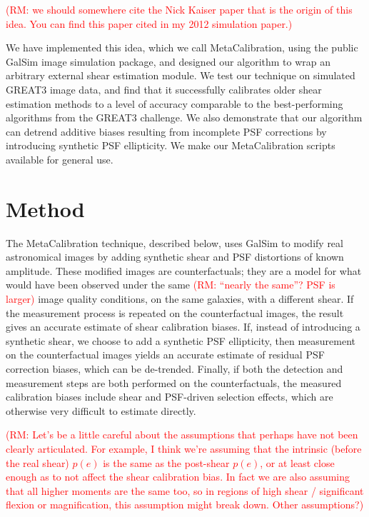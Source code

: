 \documentclass[iop]{emulateapj}
\newcommand\rmcomment[1]{\textcolor{red}{(RM: #1)}}
\begin{document}
\rmcomment{we should somewhere cite the Nick Kaiser paper that is the origin of this idea. 
  You can find this paper cited in my 2012 simulation paper.}

We have implemented this idea, which we call MetaCalibration, using
the public GalSim \citep{2015A&C....10..121R} image simulation
package, and designed our algorithm to wrap an arbitrary external
shear estimation module. We test our technique on simulated GREAT3
image data, and find that it successfully calibrates older shear
estimation methods to a level of accuracy comparable to the
best-performing algorithms from the GREAT3 challenge. We also
demonstrate that our algorithm can detrend additive biases resulting
from incomplete PSF corrections by introducing synthetic PSF
ellipticity.  We make our MetaCalibration scripts available for
general use.

\section{Method}
The MetaCalibration technique, described below, uses GalSim
\citep{2015A&C....10..121R} to modify real astronomical images by
adding synthetic shear and PSF distortions of known amplitude. These
modified images are counterfactuals; they are a model for what would
have been observed under the same \rmcomment{``nearly the same''?  PSF is larger} image quality conditions, on the
same galaxies, with a different shear. If the measurement process is
repeated on the counterfactual images, the result gives an accurate
estimate of shear calibration biases. If, instead of introducing a
synthetic shear, we choose to add a synthetic PSF ellipticity, then
measurement on the counterfactual images yields an accurate estimate
of residual PSF correction biases, which can be de-trended.  Finally,
if both the detection and measurement steps are both performed on the
counterfactuals, the measured calibration biases include shear and
PSF-driven selection effects, which are otherwise very difficult to
estimate directly.

 \rmcomment{Let's be a little careful about the assumptions that perhaps have not been clearly
   articulated.  For example, I think we're assuming that the intrinsic (before the real shear)
   $p(e)$ is the same as the post-shear $p(e)$, or at least close enough as to not affect the shear
   calibration bias.  In fact we are also assuming that all higher moments are the same too, so in
   regions of high shear / significant flexion or magnification, this assumption might break down.  Other
   assumptions?}
\end{document}
